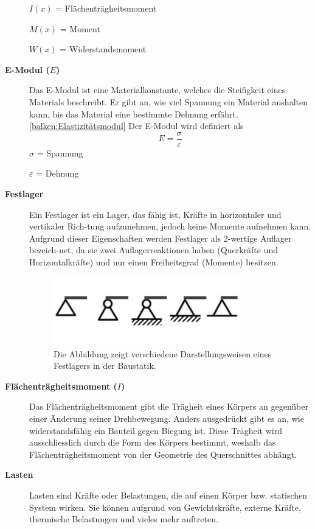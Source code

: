 \begin{description}
$I(x)$ = Flächenträgheitsmoment

$M(x)$ = Moment 

$W(x)$ = Widerstandsmoment

\item[\textbf{E-Modul ($E$)}] Das E-Modul ist eine Materialkonstante, welches die Steifigkeit eines Materials beschreibt.
Er gibt an, wie viel Spannung ein Material aushalten kann, bis das Material eine bestimmte Dehnung erfährt. \ref{balken:Elastizitätsmodul}
Der E-Modul wird definiert als
\begin{equation}
E=
\frac{\sigma}{\varepsilon}
\end{equation}
$σ$ = Spannung

$ε$ = Dehnung

\item[\textbf{Festlager}] Ein Festlager ist ein Lager, das fähig ist, Kräfte in horizontaler und vertikaler Rich-tung aufzunehmen, jedoch keine Momente aufnehmen kann.
Aufgrund dieser Eigenschaften werden Festlager als 2-wertige Auflager bezeich-net, da sie zwei Auflagerreaktionen haben (Querkräfte und Horizontalkräfte) und nur einen Freiheitsgrad (Momente) besitzen.
\begin{figure} [h]
	\centering
	\includegraphics[width=0.8\textwidth]{papers/balken/images/teil1/Festlager.jpg}
	\caption{Die Abbildung zeigt verschiedene Darstellungsweisen eines Festlagers in der Baustatik.}
	\label{fig:Die Abbildung zeigt verschiedene Darstellungsweisen eines Festlagers in der Baustatik.}
\end{figure}
\item[\textbf{Flächenträgheitsmoment ($I$)}] Das Flächenträgheitsmoment gibt die Trägheit eines Körpers an gegenüber einer Änderung seiner Drehbewegung.
Anders ausgedrückt gibt es an, wie widerstandsfähig ein Bauteil gegen Biegung ist.
Diese Trägheit wird ausschliesslich durch die Form des Körpers bestimmt, weshalb das Flächenträgheitsmoment von der Geometrie des Querschnittes abhängt.
\item[\textbf{Lasten}] Lasten sind Kräfte oder Belastungen, die auf einen Körper bzw. statischen System wirken.
Sie können aufgrund von Gewichtskräfte, externe Kräfte, thermische Belastungen und vieles mehr auftreten.

\end{description}
